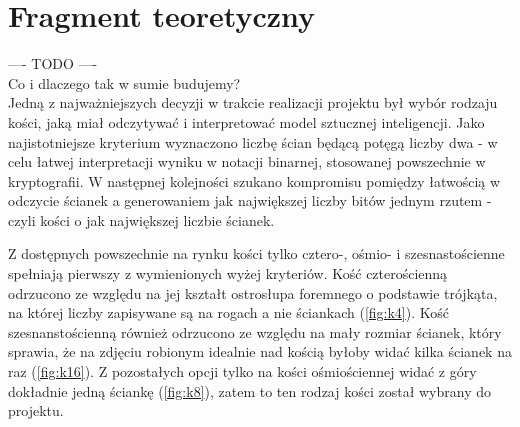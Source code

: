 \chapter{Fragment teoretyczny}\label{ch:fragment-teoretyczny}

---- TODO ---- \\

Co i dlaczego tak w sumie budujemy? \\

Jedną z najważniejszych decyzji w trakcie realizacji projektu był wybór rodzaju kości, jaką miał odczytywać 
i interpretować model sztucznej inteligencji. Jako najistotniejsze kryterium wyznaczono liczbę ścian będącą 
potęgą liczby dwa - w celu łatwej interpretacji wyniku w notacji binarnej, stosowanej powszechnie w kryptografii.
W następnej kolejności szukano kompromisu pomiędzy łatwością w odczycie ścianek a generowaniem jak największej liczby
bitów jednym rzutem - czyli kości o jak największej liczbie ścianek. 
\par
Z dostępnych powszechnie na rynku kości tylko cztero-, ośmio- i szesnastościenne spełniają pierwszy z wymienionych
wyżej kryteriów. Kość czterościenną odrzucono ze względu na jej kształt ostrosłupa foremnego o podstawie trójkąta, 
na której liczby zapisywane są na rogach a nie ściankach (\ref{fig:k4}). Kość szesnanstościenną również odrzucono ze względu na
mały rozmiar ścianek, który sprawia, że na zdjęciu robionym idealnie nad kością byłoby widać kilka ścianek na raz (\ref{fig:k16}).
Z pozostałych opcji tylko na kości ośmiościennej widać z góry dokładnie jedną ściankę (\ref{fig:k8}), zatem to ten rodzaj kości
został wybrany do projektu.


